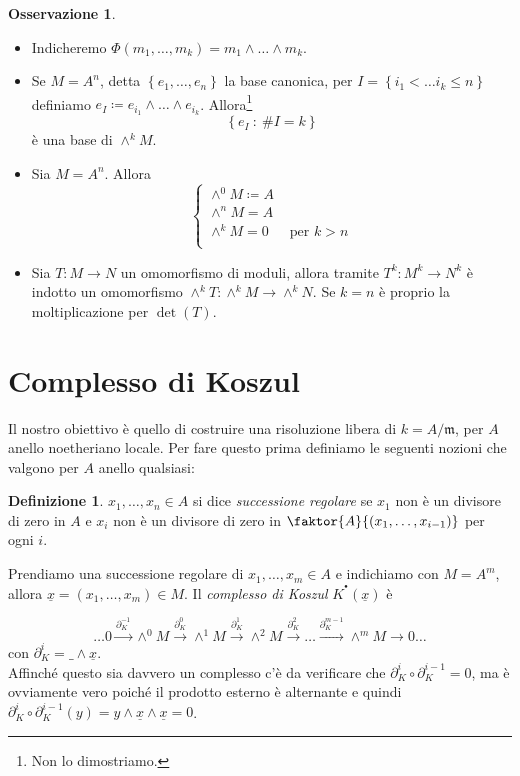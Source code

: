 \documentclass[a4paper,11pt,oneside]{book}
\newcommand{\m}{\mathfrak{m}}
\newcommand{\set}[1]{\left\{ #1 \right\}}
\newcommand{\complx}[1]{#1^{^\bullet}}
\theoremstyle{definition}
\newtheorem{de}{Definizione}
\newtheorem{oss}[section]{Osservazione}
\begin{document}
    \begin{oss}\
    \begin{itemize}
     \item Indicheremo $\Phi (m_1, \dots, m_k)= m_1\wedge \dots\wedge m_k.$
     \item Se $M=A^n$, detta $\set{e_1,\dots, e_n}$ la base canonica,  per $I=\set{i_1<\dots i_k\leq n}$ definiamo
	    $e_I\coloneqq e_{i_1}\wedge\dots\wedge e_{i_k}$. Allora\footnote{Non lo dimostriamo.} 
	    \[
	     \set{e_I  \ \colon \ \#I=k}
	    \]
	  è una base di $\wedge^kM$.
     \item Sia $M=A^n$. Allora 
	    \[
	     \begin{cases}
	      \wedge^0 M\coloneqq A\\
	      \wedge^n M=A\\
	      \wedge^k M=0 & \text{ per } k>n \\
	     \end{cases}
	    \]
     \item Sia $T\colon M\rightarrow N$ un omomorfismo di moduli, allora
		tramite $T^k\colon M^k\rightarrow N^k$ è indotto un omomorfismo $\wedge^k T\colon \wedge^k M\rightarrow \wedge^k N$.
		Se $k=n$ è proprio la moltiplicazione per $\det (T)$.
    \end{itemize}
    \end{oss}   

   \section{Complesso di Koszul}
    Il nostro obiettivo è quello di costruire una risoluzione libera di $k=A/\m$, per $A$ anello noetheriano locale.
    Per fare questo prima definiamo le seguenti nozioni che valgono per $A$ anello qualsiasi:
    \begin{de}
     $x_1,\dots,x_n\in A$ si dice \emph{successione regolare} se $x_1$ non è un divisore di zero in $A$ e 
     $x_i$ non è un divisore di zero in $\faktor {A}{(x_1,\dots,x_{i-1})}$ per ogni $i$.
    \end{de}
    \noindent
    Prendiamo una successione regolare di $x_1,\dots,x_m\in A$  e indichiamo con $M=A^m$, allora
    $\underline{x}=(x_1,\dots,x_m)\in M$. Il \emph{complesso di Koszul} $\complx K (\underline x)$ è
    
    \[
    \dots 0 \xrightarrow{\partial_K^{-1}} \wedge^0 M \xrightarrow{\partial_K^{0}} \wedge^1 M \xrightarrow{\partial_K^{1}}\wedge^2 M
    \xrightarrow{\partial_K^{2}}\dots\xrightarrow{\partial_K^{m-1}}\wedge^m M\rightarrow 0\dots
    \]
    con $\partial_K^i=\_\wedge \underline{x}$.\\
    Affinché questo sia davvero un complesso c'è da verificare che $\partial_K^i\circ \partial_K^{i-1}=0$, ma è ovviamente vero
    poiché il prodotto esterno è alternante e quindi
    $\partial_K^i\circ \partial_K^{i-1}(y)=y\wedge \underline{x}\wedge \underline{x}=0$.\\
    
\end{document}
